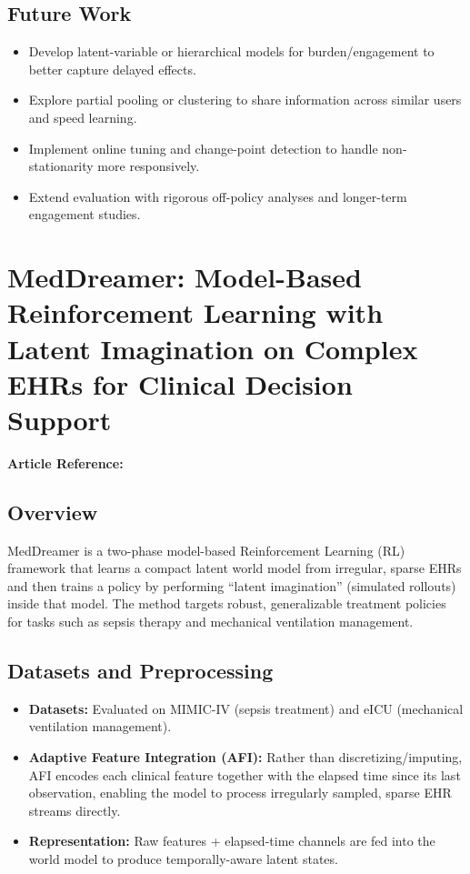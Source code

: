 \subsection*{Future Work}
\begin{itemize}
    \item Develop latent-variable or hierarchical models for burden/engagement to better capture delayed effects.
    \item Explore partial pooling or clustering to share information across similar users and speed learning.
    \item Implement online tuning and change-point detection to handle non-stationarity more responsively.
    \item Extend evaluation with rigorous off-policy analyses and longer-term engagement studies.
\end{itemize}

\section{MedDreamer: Model-Based Reinforcement Learning with Latent Imagination on Complex EHRs for Clinical Decision Support}
\textbf{Article Reference:} \cite{PDFMedDreamerModelBased}
\subsection*{Overview}
MedDreamer is a two-phase model-based Reinforcement Learning (RL) framework that learns a compact latent world model from irregular, sparse EHRs and then trains a policy by performing ``latent imagination'' (simulated rollouts) inside that model. The method targets robust, generalizable treatment policies for tasks such as sepsis therapy and mechanical ventilation management.

\subsection*{Datasets and Preprocessing}
\begin{itemize}
    \item \textbf{Datasets:} Evaluated on MIMIC-IV (sepsis treatment) and eICU (mechanical ventilation management).
    \item \textbf{Adaptive Feature Integration (AFI):} Rather than discretizing/imputing, AFI encodes each clinical feature together with the elapsed time since its last observation, enabling the model to process irregularly sampled, sparse EHR streams directly.
    \item \textbf{Representation:} Raw features + elapsed-time channels are fed into the world model to produce temporally-aware latent states.
\end{itemize}

